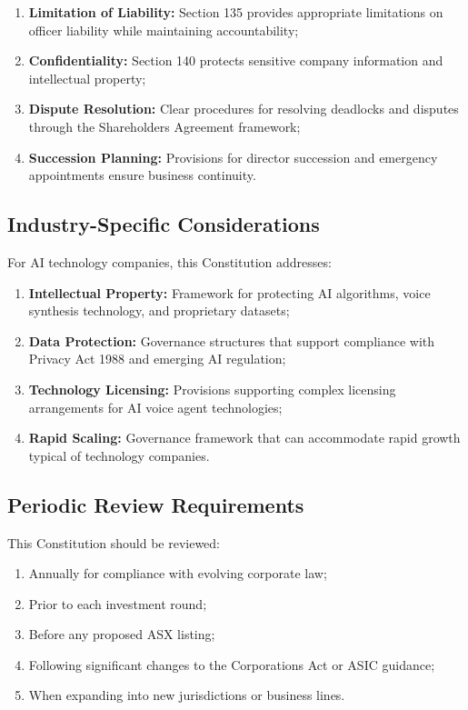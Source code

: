 \begin{enumerate}[label=(\alph*)]
    \item \textbf{Limitation of Liability:} Section 135 provides appropriate limitations on officer liability while maintaining accountability;
    
    \item \textbf{Confidentiality:} Section 140 protects sensitive company information and intellectual property;
    
    \item \textbf{Dispute Resolution:} Clear procedures for resolving deadlocks and disputes through the Shareholders Agreement framework;
    
    \item \textbf{Succession Planning:} Provisions for director succession and emergency appointments ensure business continuity.
\end{enumerate}

\subsection{Industry-Specific Considerations}

For AI technology companies, this Constitution addresses:

\begin{enumerate}[label=(\alph*)]
    \item \textbf{Intellectual Property:} Framework for protecting AI algorithms, voice synthesis technology, and proprietary datasets;
    
    \item \textbf{Data Protection:} Governance structures that support compliance with Privacy Act 1988 and emerging AI regulation;
    
    \item \textbf{Technology Licensing:} Provisions supporting complex licensing arrangements for AI voice agent technologies;
    
    \item \textbf{Rapid Scaling:} Governance framework that can accommodate rapid growth typical of technology companies.
\end{enumerate}

\subsection{Periodic Review Requirements}

This Constitution should be reviewed:

\begin{enumerate}[label=(\alph*)]
    \item Annually for compliance with evolving corporate law;
    \item Prior to each investment round;
    \item Before any proposed ASX listing;
    \item Following significant changes to the Corporations Act or ASIC guidance;
    \item When expanding into new jurisdictions or business lines.
\end{enumerate} 